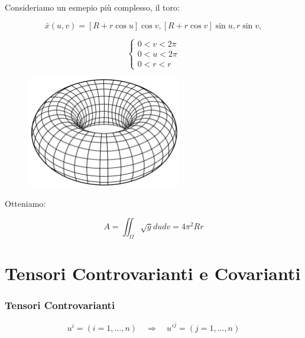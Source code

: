 \begin{exampleblock}[Toro]
    Consideriamo un esmepio più complesso, il toro:

    $$
    \bar x (u, v) = [R + r \cos u] \cos v, [R + r \cos v] \sin u, r \sin v,
    $$
    
    \begin{minipage}[H]{0.5\textwidth}
        $$
        \begin{cases}
            0 < v < 2\pi \\
            0 < u < 2\pi \\
            0 < r < r
        \end{cases}
        $$
    \end{minipage}%
    \begin{minipage}[H]{0.5\textwidth}
        \begin{figure}[H]
            \centering
            \includegraphics[width=0.6\textwidth]{assets/toro.png}
        \end{figure}
    \end{minipage}
    
    Otteniamo:

    $$
    A = \iint_{\Omega} \sqrt{g} du dv = \boxed{4 \pi^2 R r}
    $$

\end{exampleblock}

\newpage

\section{Tensori Controvarianti e Covarianti}

\subsubsection{Tensori Controvarianti}

$$
u^i = (i = 1, \dots, n) \quad \Rightarrow \quad u'^j = (j = 1, ..., n)
$$


